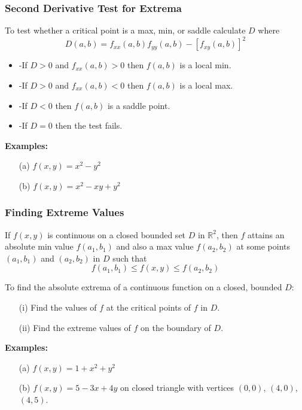 \documentclass{beamer}
\begin{document}
\begin{frame}
\frametitle{Second Derivative Test for Extrema}
To test whether a critical point is a max, min, or saddle calculate $D$ where
$$D(a,b) = f_{xx}(a,b)f_{yy}(a,b) - [f_{xy}(a,b)]^2$$
\begin{itemize}
	\item -If $D>0$ and $f_{xx}(a,b) > 0$ then $f(a,b)$ is a local min.
	\item -If $D>0$ and $f_{xx}(a,b) < 0$ then $f(a,b)$ is a local max.
	\item -If $D<0$ then $f(a,b)$ is a saddle point.
	\item -If $D=0$ then the test fails.
\end{itemize}

\vspace{6pt}
\textbf{Examples:}
\begin{itemize}
	\item[(a)] $f(x,y) = x^2-y^2$
	\item[(b)] $f(x,y) = x^2-xy + y^2$
\end{itemize}
\end{frame}

\begin{frame}
\frametitle{Finding Extreme Values}
\begin{theorem}
	If $f(x,y)$ is continuous on a closed bounded set $D$ in $\mathbb{R}^2$, then $f$ attains an absolute min value $f(a_1,b_1)$ and also a max value $f(a_2,b_2)$ at some points $(a_1,b_1)$ and $(a_2,b_2)$ in $D$ such that
	$$f(a_1,b_1) \leq f(x,y) \leq f(a_2,b_2)$$
\end{theorem}

To find the absolute extrema of a continuous function on a closed, bounded $D$:
\begin{itemize}
	\item[(i)] Find the values of $f$ at the critical points of $f$ in $D$.
	\item[(ii)] Find the extreme values of $f$ on the boundary of $D$.
\end{itemize}

\vspace{6pt}
\textbf{Examples:}\\
\begin{itemize}
	\item[(a)] $f(x,y) = 1+x^2+y^2$
	\item[(b)] $f(x,y) = 5-3x+4y$ on closed triangle with vertices $(0,0)$, $(4,0)$, $(4,5)$.
\end{itemize}
\end{frame}
\end{document}
